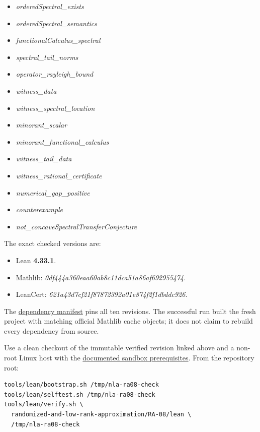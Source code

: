 \documentclass[11pt,a4paper]{article}
\providecommand{\tightlist}{\setlength{\itemsep}{0pt}\setlength{\parskip}{0pt}}
\begin{document}
\begin{itemize}
\tightlist
\item
  \textit{orderedSpectral\_exists}
\item
  \textit{orderedSpectral\_semantics}
\item
  \textit{functionalCalculus\_spectral}
\item
  \textit{spectral\_tail\_norms}
\item
  \textit{operator\_rayleigh\_bound}
\item
  \textit{witness\_data}
\item
  \textit{witness\_spectral\_location}
\item
  \textit{minorant\_scalar}
\item
  \textit{minorant\_functional\_calculus}
\item
  \textit{witness\_tail\_data}
\item
  \textit{witness\_rational\_certificate}
\item
  \textit{numerical\_gap\_positive}
\item
  \textit{counterexample}
\item
  \textit{not\_concaveSpectralTransferConjecture}
\end{itemize}

The exact checked versions are:

\begin{itemize}
\tightlist
\item
  Lean \textbf{4.33.1}.
\item
  Mathlib: \textit{0df444a360eaa60ab8c11dca51a86af692955474}.
\item
  LeanCert: \textit{621a43d7cf21f87872392a01e874f2f1dbddc926}.
\end{itemize}

The
\href{https://github.com/ajt60gaibb/OpenProblemsInNLA/blob/main/randomized-and-low-rank-approximation/RA-08/lean/lake-manifest.json}{dependency
manifest} pins all ten revisions. The successful run built the fresh
project with matching official Mathlib cache objects; it does not claim
to rebuild every dependency from source.

Use a clean checkout of the immutable verified revision linked above and
a non-root Linux host with the
\href{https://github.com/ajt60gaibb/OpenProblemsInNLA/blob/main/tools/lean/HARNESS.md}{documented
sandbox prerequisites}. From the repository root:

\begin{verbatim}
tools/lean/bootstrap.sh /tmp/nla-ra08-check
tools/lean/selftest.sh /tmp/nla-ra08-check
tools/lean/verify.sh \
  randomized-and-low-rank-approximation/RA-08/lean \
  /tmp/nla-ra08-check
\end{verbatim}
\end{document}
